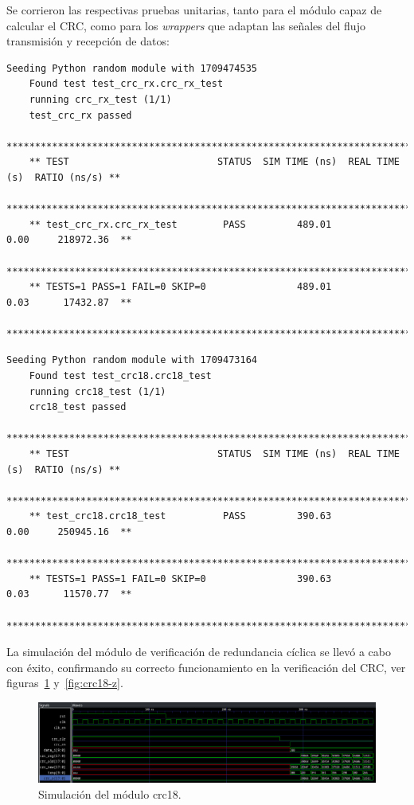  Se corrieron las respectivas pruebas unitarias, tanto para el módulo capaz de
  calcular el CRC, como para los \textit{wrappers} que adaptan las señales del
  flujo transmisión y recepción de datos:

  {\tiny\begin{lstlisting}[caption= "Resultados \textit{test} recepción de redundancia cíclica.]
    Seeding Python random module with 1709474535
    Found test test_crc_rx.crc_rx_test
    running crc_rx_test (1/1)
    test_crc_rx passed
    **************************************************************************************
    ** TEST                          STATUS  SIM TIME (ns)  REAL TIME (s)  RATIO (ns/s) **
    **************************************************************************************
    ** test_crc_rx.crc_rx_test        PASS         489.01           0.00     218972.36  **
    **************************************************************************************
    ** TESTS=1 PASS=1 FAIL=0 SKIP=0                489.01           0.03      17432.87  **
    **************************************************************************************
  \end{lstlisting}}

  {\tiny\begin{lstlisting}[caption= "Resultados \textit{test} cálculo de redundancia cíclica.]
    Seeding Python random module with 1709473164
    Found test test_crc18.crc18_test
    running crc18_test (1/1)
    crc18_test passed
    **************************************************************************************
    ** TEST                          STATUS  SIM TIME (ns)  REAL TIME (s)  RATIO (ns/s) **
    **************************************************************************************
    ** test_crc18.crc18_test          PASS         390.63           0.00     250945.16  **
    **************************************************************************************
    ** TESTS=1 PASS=1 FAIL=0 SKIP=0                390.63           0.03      11570.77  **
    **************************************************************************************
  \end{lstlisting}}

  La simulación del módulo de verificación de redundancia cíclica se llevó a cabo
  con éxito, confirmando su correcto funcionamiento en la verificación del CRC,
  ver figuras~\ref{fig:crc18} y~\ref{fig:crc18-z}\@.

  \begin{figure}[htbp]
    \centering
    \includegraphics[width=1\textwidth]{./Figures/crc18.png}
    \caption{Simulación del módulo crc18.}\label{fig:crc18}
  \end{figure}

